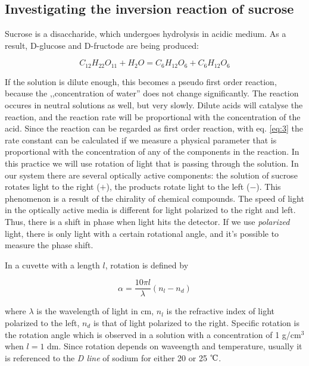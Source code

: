 \subsection{Investigating the inversion reaction of sucrose}
Sucrose is a disaccharide, which undergoes hydrolysis in acidic medium. As a result, D-glucose and D-fructode are being produced:

\begin{equation}
\label{eq:inversion}
	C_{12}H_{22}O_{11} + H_2O = C_6H_{12}O_6 + C_6H_{12}O_6
\end{equation}

If the solution is dilute enough, this becomes a pseudo first order reaction, because the ,,concentration of water'' does not change significantly.
The reaction occures in neutral solutions as well, but very slowly. Dilute acids will catalyse the reaction, and the reaction rate will be proportional with the concentration of the acid.
Since the reaction can be regarded as first order reaction, with eq. \ref{eq:3} the rate constant can be calculated if we measure a physical parameter that is proportional with the concentration of any of the components in the reaction.
In this practice we will use rotation of light that is passing through the solution.
In our system there are several optically active components: the solution of sucrose rotates light to the right ($+$), the products rotate light to the left ($-$).
This phenomenon is a result of the chirality of chemical compounds.
The speed of light in the optically active media is different for light polarized to the right and left.
Thus, there is a shift in phase when light hits the detector. If we use \emph{polarized} light, there is only light with a certain rotational angle, and it's possible to measure the phase shift.

In a cuvette with a length $l$, rotation is defined by

\begin{equation}
\label{fig:rotation}
	\alpha
	=\frac{10 \pi l}{\lambda}
	(n_l -  n_d)
\end{equation}

where $\lambda$ is the wavelength of light in cm, $n_l$ is the refractive index of light polarized to the left, $n_d$ is that of light polarized to the right.
Specific rotation is the rotation angle which is observed in a solution with a concentration of 1 g/cm$^3$ when $l = 1$ dm.
Since rotation depends on waveength and temperature, usually it is referenced to the \emph{D line} of sodium for either 20 or 25 $\celsius$.


